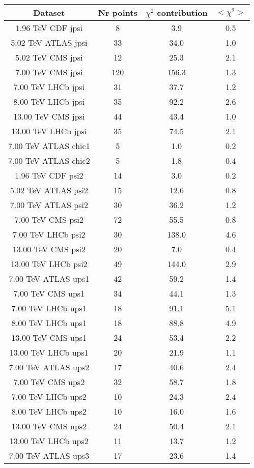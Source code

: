 \begin{table}[h!]
\centering
\begin{tabular}{c|c|c|c}
Dataset & Nr points & $\chi^2$ contribution & $<\chi^2>$ \\
\hline
1.96 TeV CDF jpsi & 8 & 3.9 & 0.5 \\
5.02 TeV ATLAS jpsi & 33 & 34.0 & 1.0 \\
5.02 TeV CMS jpsi & 12 & 25.3 & 2.1 \\
7.00 TeV CMS jpsi & 120 & 156.3 & 1.3 \\
7.00 TeV LHCb jpsi & 31 & 37.7 & 1.2 \\
8.00 TeV LHCb jpsi & 35 & 92.2 & 2.6 \\
13.00 TeV CMS jpsi & 44 & 43.4 & 1.0 \\
13.00 TeV LHCb jpsi & 35 & 74.5 & 2.1 \\
7.00 TeV ATLAS chic1 & 5 & 1.0 & 0.2 \\
7.00 TeV ATLAS chic2 & 5 & 1.8 & 0.4 \\
1.96 TeV CDF psi2 & 14 & 3.0 & 0.2 \\
5.02 TeV ATLAS psi2 & 15 & 12.6 & 0.8 \\
7.00 TeV ATLAS psi2 & 30 & 36.2 & 1.2 \\
7.00 TeV CMS psi2 & 72 & 55.5 & 0.8 \\
7.00 TeV LHCb psi2 & 30 & 138.0 & 4.6 \\
13.00 TeV CMS psi2 & 20 & 7.0 & 0.4 \\
13.00 TeV LHCb psi2 & 49 & 144.0 & 2.9 \\
7.00 TeV ATLAS ups1 & 42 & 59.2 & 1.4 \\
7.00 TeV CMS ups1 & 34 & 44.1 & 1.3 \\
7.00 TeV LHCb ups1 & 18 & 91.1 & 5.1 \\
8.00 TeV LHCb ups1 & 18 & 88.8 & 4.9 \\
13.00 TeV CMS ups1 & 24 & 53.4 & 2.2 \\
13.00 TeV LHCb ups1 & 20 & 21.9 & 1.1 \\
7.00 TeV ATLAS ups2 & 17 & 40.6 & 2.4 \\
7.00 TeV CMS ups2 & 32 & 58.7 & 1.8 \\
7.00 TeV LHCb ups2 & 10 & 24.3 & 2.4 \\
8.00 TeV LHCb ups2 & 10 & 16.0 & 1.6 \\
13.00 TeV CMS ups2 & 24 & 50.4 & 2.1 \\
13.00 TeV LHCb ups2 & 11 & 13.7 & 1.2 \\
7.00 TeV ATLAS ups3 & 17 & 23.6 & 1.4 \\

\end{tabular}
\end{table}
